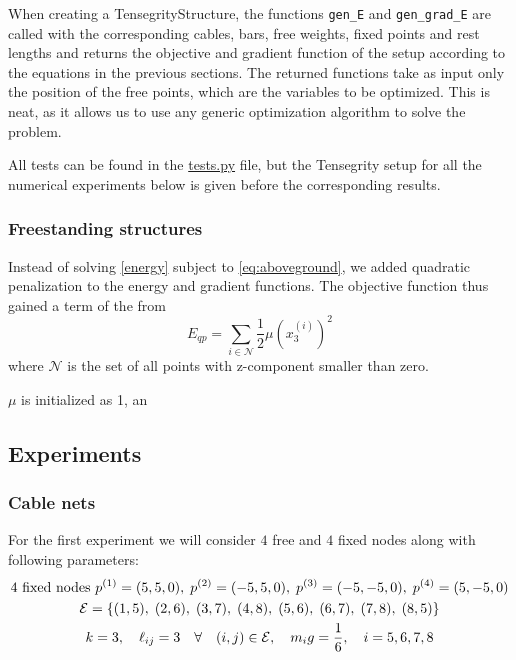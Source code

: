 When creating a TensegrityStructure, the functions \lstinline{gen_E}  and \lstinline{gen_grad_E} are called with the corresponding cables, bars, free weights, fixed points and rest lengths and returns the objective and gradient function of the setup according to the equations in the previous sections. The returned functions take as input only the position of the free points, which are the variables to be optimized. This is neat, as it allows us to use any generic optimization algorithm to solve the problem.

All tests can be found in the \href{https://github.com/otkulseng/Opt1_Project/blob/main/Kode/tests.py}{tests.py} file, but the Tensegrity setup for all the numerical experiments below is given before the corresponding results.

\subsubsection{Freestanding structures}
Instead of solving \eqref{energy} subject to \eqref{eq:aboveground}, we added quadratic penalization to the energy and gradient functions. The objective function thus gained a term of the from 
\begin{equation}
    E_{qp} = \sum_{i \in \mathcal{N}} \frac{1}{2} \mu (x_3^{(i)})^2
\end{equation}
where $\mathcal{N}$ is the set of all points with z-component smaller than zero. 

$\mu$ is initialized as 1, an

\subsection{Experiments}
\subsubsection{Cable nets}
For the first experiment we will consider $4$ free and $4$ fixed nodes along with following parameters:
\begin{equation*}
\begin{gathered}
    4 \text{ fixed nodes } p^{(1)} = (5,5,0),\; p^{(2)} = (-5,5,0),\; p^{(3)} = (-5,-5,0),\; p^{(4)} = (5,-5,0) \\
    \mathcal{E} = \{(1,5),\;(2,6),\;(3,7),\;(4,8),\; (5,6),\; (6,7),\; (7,8),\; (8,5) \}\\
    k=3,\quad \ell_{ij} = 3 \quad \forall \quad (i,j) \in \mathcal{E}, \quad m_i g = \frac{1}{6}, \quad i= 5,6,7,8 
\end{gathered}
\end{equation*}

